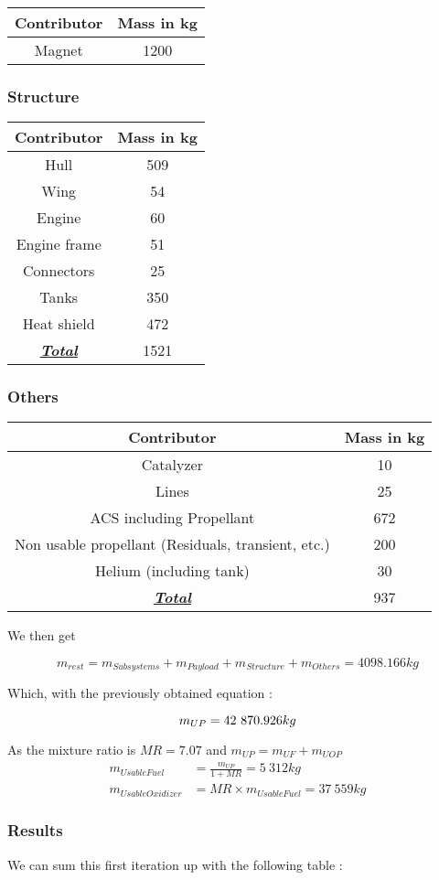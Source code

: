 \begin{longtable}[]{@{}cc@{}}
\toprule
Contributor & Mass in kg\tabularnewline
\midrule
\endhead
Magnet & 1200\tabularnewline
\bottomrule
\end{longtable}


\subsubsection{Structure}

\begin{longtable}[]{@{}cc@{}}
\toprule
Contributor & Mass in kg\tabularnewline
\midrule
\endhead
Hull & 509\tabularnewline
Wing & 54\tabularnewline
Engine & 60\tabularnewline
Engine frame & 51\tabularnewline
Connectors & 25\tabularnewline
Tanks & 350\tabularnewline
Heat shield & 472\tabularnewline
\underline{\textbf{\emph{Total}}} & 1521\tabularnewline
\bottomrule
\end{longtable}


\subsubsection{Others}

\begin{longtable}[]{@{}cc@{}}
\toprule
Contributor & Mass in kg\tabularnewline
\midrule
\endhead
Catalyzer & 10\tabularnewline
Lines & 25\tabularnewline
ACS including Propellant & 672\tabularnewline
Non usable propellant (Residuals, transient, etc.) & 200\tabularnewline
Helium (including tank) & 30\tabularnewline
\underline{\textbf{\emph{Total}}} & 937\tabularnewline
\bottomrule
\end{longtable}

We then get

\[m_{rest} = m_{Sub systems} + m_{Payload} + m_{Structure} + m_{Others} = 4098.166kg\]

Which, with the previously obtained equation :

\[m_{UP} = 42\ 870.926kg\\\]

As the mixture ratio is $MR = 7.07$ and $m_{UP} = m_{UF} + m_{UOP}$\\
\begin{align*}
m_{UsableFuel} &= \frac{m_{UP}}{1 + MR} = 5\ 312kg\\
m_{UsableOxidizer} &= MR \times m_{UsableFuel} =37\ 559kg
\end{align*}

\subsubsection{Results}
We can sum this first iteration up with the following table :

